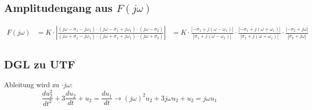 \subsection{Amplitudengang aus $F\left(j\omega\right)$}
\begin{align}
F(j\omega)&=K\cdot\left|\frac{(j\omega-\sigma_1-j\omega_1)\cdot(j\omega-\sigma_1+j\omega_1)\cdot(j\omega-\sigma_2)}{(j\omega+\sigma_1-j\omega_1)\cdot(j\omega+\sigma_1+j\omega_1)\cdot(j\omega+\sigma_2)}\right| 
&= K \cdot \frac{\left|-\sigma_1+j\left(\omega-\omega_1\right)\right|}{\left|\sigma_1+j\left(\omega-\omega_1\right)\right|} \cdot \frac{\left|-\sigma_1+j\left(\omega+\omega_1\right)\right|}{\left|\sigma_1+j\left(\omega+\omega_1\right)\right|} \cdot \frac{\left|-\sigma_2+j\omega\right|}{\left|\sigma_2+j\omega\right|} \nonumber
\end{align}

\subsection{DGL zu UTF}
Ableitung wird zu $\cdot j \omega$:
\[ \frac{du_2^2}{dt^2} + 3\frac{du_2}{dt} + u_2 = \frac{du_1}{dt} \longrightarrow (j\omega)^2u_2 + 3j\omega u_2 + u_2 = j\omega u_1
\]


